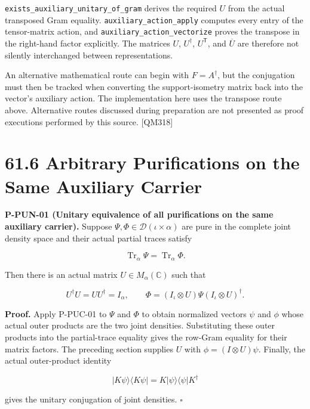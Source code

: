 \documentclass[
  11pt,
  oneside]{book}
\begin{document}
\texttt{exists\_\allowbreak auxiliary\_\allowbreak unitary\_\allowbreak of\_\allowbreak gram} derives the required \(U\)
from the actual transposed Gram equality.
\texttt{auxiliary\_\allowbreak action\_\allowbreak apply} computes every entry of the
tensor-matrix action, and \texttt{auxiliary\_\allowbreak action\_\allowbreak vectorize} proves
the transpose in the right-hand factor explicitly. The matrices \(U\),
\(U^\dagger\), \(U^\mathsf T\), and \(\overline U\) are therefore not
silently interchanged between representations.

An alternative mathematical route can begin with \(F=A^\dagger\), but
the conjugation must then be tracked when converting the
support-isometry matrix back into the vector's auxiliary action. The
implementation here uses the transpose route above. Alternative routes
discussed during preparation are not presented as proof executions
performed by this source. {[}QM318{]}

\section{61.6 Arbitrary Purifications on the Same Auxiliary Carrier}

\label{p-pun-01}{}

\textbf{P-PUN-01 (Unitary equivalence of all purifications on the same
auxiliary carrier).} Suppose
\(\Psi,\Phi\in\mathcal D(\iota\times\alpha)\) are pure in the complete
joint density space and their actual partial traces satisfy

\[
\operatorname{Tr}_\alpha\Psi=\operatorname{Tr}_\alpha\Phi.
\]

Then there is an actual matrix \(U\in M_\alpha(\mathbb C)\) such that

\[
U^\dagger U=UU^\dagger=I_\alpha,
\qquad
\Phi=(I_\iota\otimes U)\Psi(I_\iota\otimes U)^\dagger.
\]

\textbf{Proof.} Apply P-PUC-01 to \(\Psi\) and \(\Phi\) to obtain
normalized vectors \(\psi\) and \(\phi\) whose actual outer products are
the two joint densities. Substituting these outer products into the
partial-trace equality gives the row-Gram equality for their matrix
factors. The preceding section supplies \(U\) with
\(\phi=(I\otimes U)\psi\). Finally, the actual outer-product identity

\[
|K\psi\rangle\langle K\psi|
=K|\psi\rangle\langle\psi|K^\dagger
\]

gives the unitary conjugation of joint densities. \(\square\)
\end{document}
